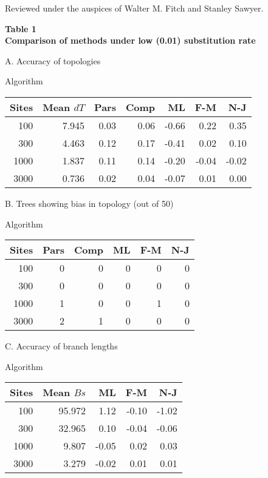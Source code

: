 \bigskip
Reviewed under the auspices of Walter M. Fitch and Stanley Sawyer.

\newpage
\begin{flushleft}
{\bf Table 1 \\
Comparison of methods under low (0.01) substitution rate}

\begin{center}
A.  Accuracy of topologies

Algorithm

\begin{tabular}{| r | r | r r r r r |}
\hline
Sites & Mean $dT$ & Pars & Comp & ML & F-M & N-J \\
\hline
100   & 7.945 & 0.03   & 0.06 & -0.66 & 0.22   & 0.35\\
300 & 4.463 & 0.12 & 0.17 & -0.41 & 0.02 & 0.10\\
1000 & 1.837 & 0.11 & 0.14 & -0.20 & -0.04  & -0.02\\
3000 & 0.736 & 0.02 & 0.04 & -0.07 & 0.01  & 0.00\\
\hline
\end{tabular}
\bigskip

B.  Trees showing bias in topology (out of 50)

Algorithm

\begin{tabular}{| r | r r r r r |}
\hline
Sites & Pars & Comp & ML & F-M & N-J\\
\hline
100 & 0 & 0 & 0 & 0 & 0\\
300 & 0 & 0 & 0 & 0 & 0\\
1000 & 1 & 0 & 0 & 1 & 0\\
3000 & 2 & 1 & 0 & 0 & 0\\
\hline
\end{tabular}
\end{center}
\bigskip

\newpage


\bigskip
\begin{center}
C.  Accuracy of branch lengths

Algorithm

\begin{tabular}{| r r | r r r |}
\hline
Sites & Mean $Bs$ & ML & F-M & N-J\\
\hline
100 & 95.972 & 1.12 & -0.10 & -1.02\\
300 & 32.965 & 0.10 & -0.04 & -0.06\\
1000 & 9.807 & -0.05 & 0.02 & 0.03\\
3000 & 3.279 & -0.02 & 0.01 & 0.01\\
\hline
\end{tabular}


\end{center}
\end{flushleft}

